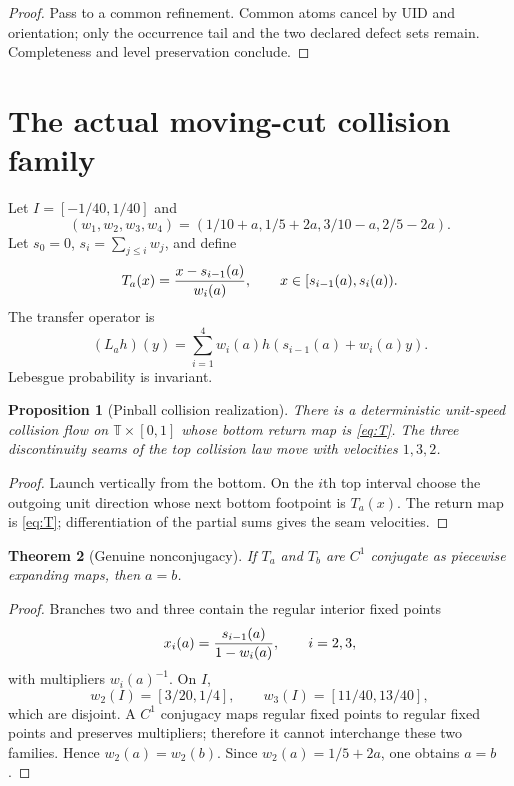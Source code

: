 \documentclass[11pt,reqno]{amsart}
\newtheorem{theorem}{Theorem}[section]
\newtheorem{proposition}[theorem]{Proposition}
\theoremstyle{definition}
\theoremstyle{remark}
\newcommand{\T}{\mathbb T}
\begin{document}
\begin{proof}
Pass to a common refinement.  Common atoms cancel by UID and orientation; only
the occurrence tail and the two declared defect sets remain.  Completeness and
level preservation conclude.
\end{proof}

\section{The actual moving-cut collision family}\label{sec:model}
Let $I=[-1/40,1/40]$ and
\[
 (w_1,w_2,w_3,w_4)=
 (1/10+a,1/5+2a,3/10-a,2/5-2a).
\]
Let $s_0=0$, $s_i=\sum_{j\le i}w_j$, and define
\begin{equation}\label{eq:T}
 T_a(x)={x-s_{i-1}(a)\over w_i(a)},
 \qquad x\in[s_{i-1}(a),s_i(a)).
\end{equation}
The transfer operator is
\begin{equation}\label{eq:L}
 (L_ah)(y)=\sum_{i=1}^4w_i(a)
 h(s_{i-1}(a)+w_i(a)y).
\end{equation}
Lebesgue probability is invariant.

\begin{proposition}[Pinball collision realization]\label{prop:collision}
There is a deterministic unit-speed collision flow on $\T\times[0,1]$ whose
bottom return map is \eqref{eq:T}.  The three discontinuity seams of the top
collision law move with velocities $1,3,2$.
\end{proposition}

\begin{proof}
Launch vertically from the bottom.  On the $i$th top interval choose the
outgoing unit direction whose next bottom footpoint is $T_a(x)$.  The return
map is \eqref{eq:T}; differentiation of the partial sums gives the seam
velocities.
\end{proof}

\begin{theorem}[Genuine nonconjugacy]\label{thm:nonconjugacy}
If $T_a$ and $T_b$ are $C^1$ conjugate as piecewise expanding maps, then
$a=b$.
\end{theorem}

\begin{proof}
Branches two and three contain the regular interior fixed points
\[
 x_i(a)={s_{i-1}(a)\over1-w_i(a)},
 \qquad i=2,3,
\]
with multipliers $w_i(a)^{-1}$.  On $I$,
\[
 w_2(I)=[3/20,1/4],
 \qquad w_3(I)=[11/40,13/40],
\]
which are disjoint.  A $C^1$ conjugacy maps regular fixed points to regular
fixed points and preserves multipliers; therefore it cannot interchange these
two families.  Hence $w_2(a)=w_2(b)$.  Since $w_2(a)=1/5+2a$, one obtains
$a=b$.
\end{proof}
\end{document}
